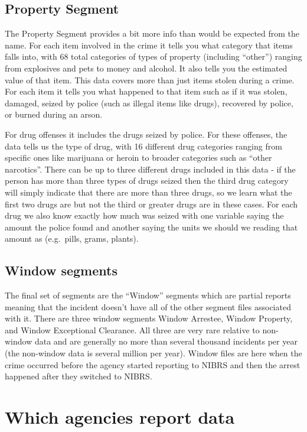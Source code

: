 \documentclass[
  12pt,
  openany]{book}
\begin{document}
\subsection{Property Segment}\label{property-segment}

The Property Segment provides a bit more info than would be expected from the name. For each item involved in the crime it tells you what category that items falls into, with 68 total categories of types of property (including ``other'') ranging from explosives and pets to money and alcohol. It also tells you the estimated value of that item. This data covers more than just items stolen during a crime. For each item it tells you what happened to that item such as if it was stolen, damaged, seized by police (such as illegal items like drugs), recovered by police, or burned during an arson.

For drug offenses it includes the drugs seized by police. For these offenses, the data tells us the type of drug, with 16 different drug categories ranging from specific ones like marijuana or heroin to broader categories such as ``other narcotics''. There can be up to three different drugs included in this data - if the person has more than three types of drugs seized then the third drug category will simply indicate that there are more than three drugs, so we learn what the first two drugs are but not the third or greater drugs are in these cases. For each drug we also know exactly how much was seized with one variable saying the amount the police found and another saying the units we should we reading that amount as (e.g.~pills, grams, plants).

\subsection{Window segments}\label{window}

The final set of segments are the ``Window'' segments which are partial reports meaning that the incident doesn't have all of the other segment files associated with it. There are three window segments Window Arrestee, Window Property, and Window Exceptional Clearance. All three are very rare relative to non-window data and are generally no more than several thousand incidents per year (the non-window data is several million per year). Window files are here when the crime occurred before the agency started reporting to NIBRS and then the arrest happened after they switched to NIBRS.

\section{Which agencies report data}\label{which-agencies-report-data}
\end{document}
